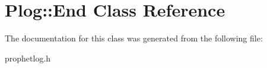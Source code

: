 \hypertarget{classPlog_1_1End}{
\section{Plog::End Class Reference}
\label{classPlog_1_1End}
}


The documentation for this class was generated from the following file:\begin{DoxyCompactItemize}
\item 
prophetlog.h\end{DoxyCompactItemize}
